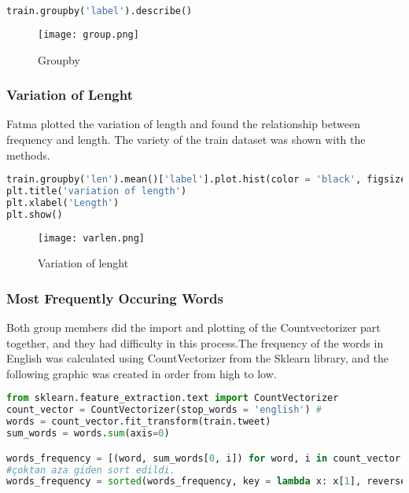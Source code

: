 \documentclass[onecolumn]{article}
\begin{document}
\begin{lstlisting}[language=Python, caption= group]
train.groupby('label').describe()
\end{lstlisting}


\begin{figure}[ht!]
\centering
\texttt{[image: group.png]}
\caption{Groupby \label{}}
\end{figure}

\subsubsection{Variation of Lenght}
Fatma  plotted the variation of length and found the relationship between frequency and length. The variety of the train dataset was shown with the methods.
\begin{lstlisting}[language=Python, caption= group]
train.groupby('len').mean()['label'].plot.hist(color = 'black', figsize = (6, 4),)
plt.title('variation of length')
plt.xlabel('Length')
plt.show()
\end{lstlisting}

\begin{figure}[ht!]
\centering
\texttt{[image: varlen.png]}
\caption{Variation of lenght \label{}}
\end{figure}
\subsubsection{Most Frequently Occuring Words}

Both group members did the import and plotting of the Countvectorizer part together, and they had difficulty in this process.The frequency of the words in English was calculated using CountVectorizer from the Sklearn library, and the following graphic was created in order from high to low.


\begin{lstlisting}[language=Python, caption= group]
from sklearn.feature_extraction.text import CountVectorizer
count_vector = CountVectorizer(stop_words = 'english') #
words = count_vector.fit_transform(train.tweet)
sum_words = words.sum(axis=0)

words_frequency = [(word, sum_words[0, i]) for word, i in count_vector.vocabulary_.items()]
#çoktan aza giden sort edildi.
words_frequency = sorted(words_frequency, key = lambda x: x[1], reverse = True)
\end{lstlisting}
\\\\\\
\end{document}

